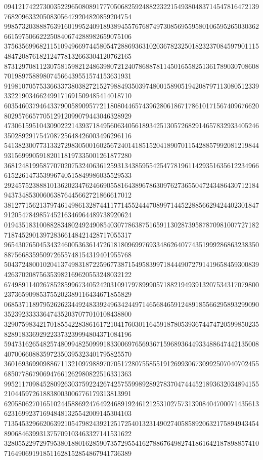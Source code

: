 \begin{DoxyCode}
      094121742273003522965080891777050682592488223221549380483714547816472139768209633205083056479204820859204754
      998573203888763916019952409189389455767687497308569559580106595265030362661597506622250840674288982659075106
      375635699682115109496697445805472886936310203678232501823237084597901115484720876182124778132663304120762165
      873129708112307581598212486398072124078688781145016558251361789030708608701989758898074566439551574153631931
      919810705753366337380382721527988493503974800158905194208797113080512339332219034662499171691509485414018710
      603546037946433790058909577211808044657439628061867178610171567409676620802957665770512912099079443046328929
      473061595104309022214393718495606340561893425130572682914657832933405246350289291754708725648426003496296116
      541382300773133272983050016025672401418515204189070115428857992081219844931569990591820118197335001261877280
      368124819958770702075324063612593134385955425477819611429351635612234966615226147353996740515849986035529533
      292457523888101362023476246690558164389678630976273655047243486430712184943734853006063876445662721866617012
      381277156213797461498613287441177145524447089971445228856629424402301847912054784985745216346964489738920624
      019435183100882834802492490854030778638751659113028739587870981007727182718745290139728366148421428717055317
      965430765045343246005363614726181809699769334862640774351999286863238350887566835950972655748154319401955768
      504372480010204137498318722596773871549583997184449072791419658459300839426370208756353982169620553248032122
      674989114026785285996734052420310917978999057188219493913207534317079800237365909853755202389116434671855829
      068537118979526262344924833924963424497146568465912489185566295893299090352392333336474352037077010108438800
      329075983421701855422838616172104176030116459187805393674474720599850235828918336929223373239994804371084196
      594731626548257480994825099918330069765693671596893644933488647442135008407006608835972350395323401795825570
      360169369909886711321097988970705172807558551912699306730992507040702455685077867906947661262980822516331363
      995211709845280926303759224267425755998928927837047444521893632034894155210445972618838003006776179313813991
      620580627016510244588692476492468919246121253102757313908404700071435613623169923716948481325542009145304103
      713545329662063921054798243921251725401323149027405858920632175894943454890684639931375709103463327141531622
      328055229729795380188016285907357295541627886764982741861642187898857410716490691918511628152854867941736389

\end{DoxyCode}
